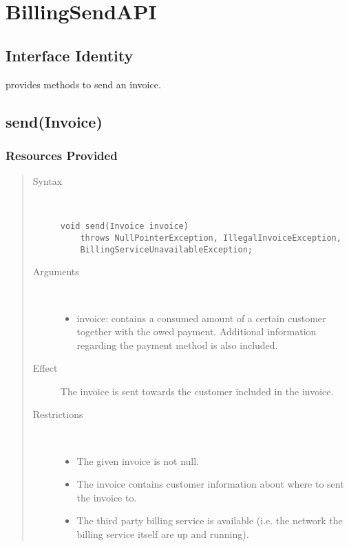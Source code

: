 \section{BillingSendAPI}
\label{api:billing-send-api}

\subsection{Interface Identity}

\npar {} provides methods to send an invoice.

\subsection{send(Invoice)}

\subsubsection{Resources Provided}

\begin{quote}
	\begin{description}
		\item[Syntax] \ 
		\begin{verbatim}
void send(Invoice invoice)
    throws NullPointerException, IllegalInvoiceException,
    BillingServiceUnavailableException;
		\end{verbatim}
		\item[Arguments] \
		\begin{itemize}
			\item invoice: contains a consumed amount of a certain customer together with
			the owed payment. Additional information regarding the payment method is
			also included.
		\end{itemize}
		\item[Effect] The invoice is sent towards the customer included in the
		invoice.
		\item[Restrictions] \ 
		\begin{itemize}
			\item The given invoice is not null.
			\item The invoice contains customer information about where to sent the
			invoice to.
			\item The third party billing service is available (i.e. the network the
			billing service itself are up and running).
		\end{itemize}
	\end{description} 
\end{quote}

